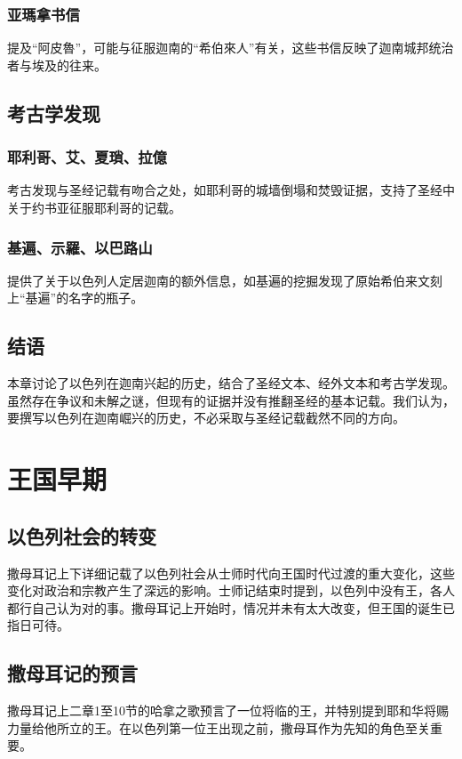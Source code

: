 \documentclass[12pt, a4paper]{ctexart}
\begin{document}
\subsubsection{亚瑪拿书信}
提及“阿皮魯”，可能与征服迦南的“希伯來人”有关，这些书信反映了迦南城邦统治者与埃及的往来。

\subsection{考古学发现}
\subsubsection{耶利哥、艾、夏瑣、拉億}
考古发现与圣经记载有吻合之处，如耶利哥的城墙倒塌和焚毁证据，支持了圣经中关于约书亚征服耶利哥的记载。
\subsubsection{基遍、示羅、以巴路山}
提供了关于以色列人定居迦南的额外信息，如基遍的挖掘发现了原始希伯来文刻上“基遍”的名字的瓶子。

\subsection{结语}
本章讨论了以色列在迦南兴起的历史，结合了圣经文本、经外文本和考古学发现。虽然存在争议和未解之谜，但现有的证据并没有推翻圣经的基本记载。我们认为，要撰写以色列在迦南崛兴的历史，不必采取与圣经记载截然不同的方向。


\section{王国早期}

\subsection{以色列社会的转变}
撒母耳记上下详细记载了以色列社会从士师时代向王国时代过渡的重大变化，这些变化对政治和宗教产生了深远的影响。士师记结束时提到，以色列中没有王，各人都行自己认为对的事。撒母耳记上开始时，情况并未有太大改变，但王国的诞生已指日可待。

\subsection{撒母耳记的预言}
撒母耳记上二章1至10节的哈拿之歌预言了一位将临的王，并特别提到耶和华将赐力量给他所立的王。在以色列第一位王出现之前，撒母耳作为先知的角色至关重要。
\end{document}

